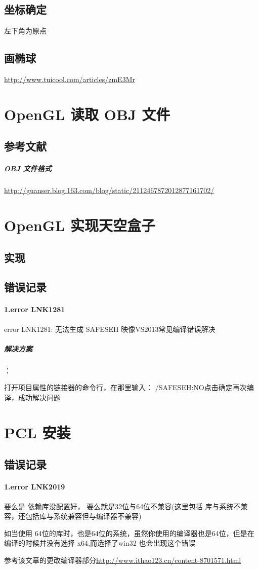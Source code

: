 \documentclass[UTF8,a4paper,8pt]{ctexart}
\begin{document}
			
	\subsection{坐标确定}
		左下角为原点
		
	\subsection{画椭球}
		\url{http://www.tuicool.com/articles/zmE3Mr}
		
\newpage
\section{OpenGL 读取 OBJ 文件}
    \subsection{参考文献} 
		\subparagraph{OBJ 文件格式}\url{http://guanser.blog.163.com/blog/static/2112467872012877161702/}
	
	
\newpage 
\section{OpenGL 实现天空盒子}
	\subsection{实现}
		
	\subsection{错误记录}
		\paragraph{1.error LNK1281}error LNK1281: 无法生成 SAFESEH 映像VS2013常见编译错误解决
		
		\subparagraph{解决方案}：
		
		打开项目属性的链接器的命令行，在那里输入： /SAFESEH:NO点击确定再次编译，成功解决问题

\newpage
\section{PCL  安装}
	\subsection{错误记录}
		\paragraph{1.error LNK2019} 要么是 依赖库没配置好， 要么就是32位与64位不兼容(这里包括 库与系统不兼容，还包括库与系统兼容但与编译器不兼容)
		
		如当使用 64位的库时，也是64位的系统，虽然你使用的编译器也是64位，但是在编译的时候并没有选择 x64,而选择了win32 也会出现这个错误
		
		参考该文章的更改编译器部分\url{http://www.ithao123.cn/content-8701571.html}
\end{document}
